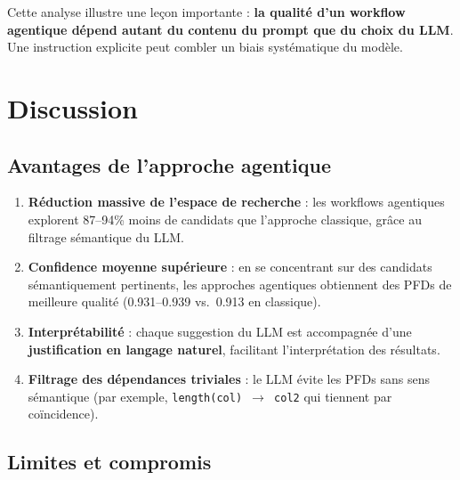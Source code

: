 \documentclass[12pt,a4paper]{article}
\begin{document}
Cette analyse illustre une le\c{c}on importante : \textbf{la qualit\'{e} d'un workflow agentique d\'{e}pend autant du contenu du prompt que du choix du LLM}. Une instruction explicite peut combler un biais syst\'{e}matique du mod\`{e}le.

\section{Discussion}
\label{sec:discussion}

\subsection{Avantages de l'approche agentique}

\begin{enumerate}
    \item \textbf{R\'{e}duction massive de l'espace de recherche} : les workflows agentiques explorent 87--94\% moins de candidats que l'approche classique, gr\^{a}ce au filtrage s\'{e}mantique du LLM.

    \item \textbf{Confidence moyenne sup\'{e}rieure} : en se concentrant sur des candidats s\'{e}mantiquement pertinents, les approches agentiques obtiennent des PFDs de meilleure qualit\'{e} (0.931--0.939 vs.\ 0.913 en classique).

    \item \textbf{Interpr\'{e}tabilit\'{e}} : chaque suggestion du LLM est accompagn\'{e}e d'une \textbf{justification en langage naturel}, facilitant l'interpr\'{e}tation des r\'{e}sultats.

    \item \textbf{Filtrage des d\'{e}pendances triviales} : le LLM \'{e}vite les PFDs sans sens s\'{e}mantique (par exemple, \texttt{length(col) $\rightarrow$ col2} qui tiennent par co\"{i}ncidence).
\end{enumerate}

\subsection{Limites et compromis}
\end{document}
